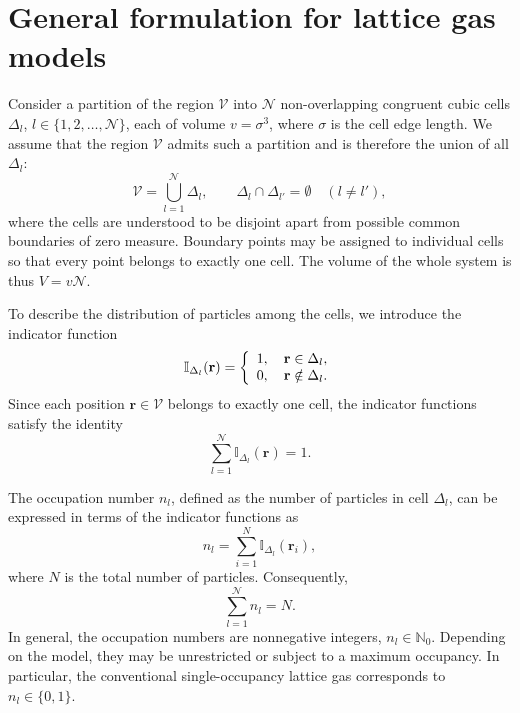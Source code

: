 \documentclass[12pt]{article}
\begin{document}
	
	\section{General formulation for lattice gas models}
	\label{sec:genLG}
	Consider a partition of the region $\mathcal{V}$ into $\mathcal{N}$ non-overlapping congruent cubic cells $\Delta_l$, $l \in \{1, 2, \ldots, \mathcal{N}\}$, each of volume $v = \sigma^3$, where $\sigma$ is the cell edge length. We assume that the region $\mathcal{V}$ admits such a partition and is therefore the union of all $\Delta_l$:
	\begin{equation}
		\mathcal{V} = \bigcup_{l=1}^{\mathcal{N}}\Delta_l,\qquad
		\Delta_l \cap \Delta_{l'} = \emptyset \quad (l \neq l'),
	\end{equation}
	where the cells are understood to be disjoint apart from possible common boundaries of zero measure. Boundary points may be assigned to individual cells so that every point belongs to exactly one cell. The volume of the whole system is thus $V = v\mathcal{N}$. 
	
	To describe the distribution of particles among the cells, we introduce the indicator function
	\begin{equation}
		\label{def:I}
		\mathbb{I}_{\Delta_l} (\vb{r}) = \left\{
		\begin{array}{ll}
			1, \quad \vb{r} \in \Delta_l,
			\\
			0, \quad \vb{r} \notin \Delta_l.
		\end{array}
		\right.
	\end{equation}
	Since each position $\mathbf{r} \in \mathcal{V}$ belongs to exactly one cell, the indicator functions satisfy the identity
	\begin{equation}
		\sum_{l=1}^{\mathcal{N}} \mathbb{I}_{\Delta_{l}}(\mathbf{r}) = 1.
	\end{equation}
	
	The occupation number $n_l$, defined as the number of particles in cell $\Delta_{l}$, can be expressed in terms of the indicator functions as
	\begin{equation}
		\label{def:occN}
		n_l = \sum_{i=1}^{N} \mathbb{I}_{\Delta_{l}}(\mathbf{r}_i),
	\end{equation}
	where $N$ is the total number of particles. Consequently,
	\begin{equation}
		\label{nlSum}
		\sum_{l=1}^{\mathcal{N}} n_l = N.
	\end{equation}
	In general, the occupation numbers are nonnegative integers, $n_l \in \mathbb{N}_0$. Depending on the model, they may be unrestricted or subject to a maximum occupancy. In particular, the conventional single-occupancy lattice gas corresponds to $n_l \in \{0, 1\}$.
	
\end{document}
